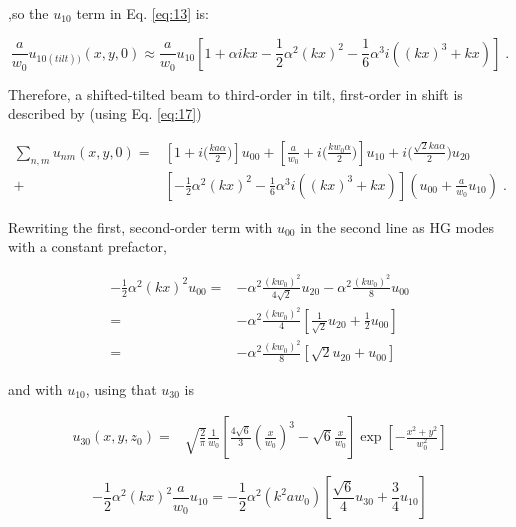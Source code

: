 \documentclass[aps,twoside,secnumarabic,balancelastpage,amsmath,amssymb,nofootinbib,hyperref=pdftex]{revtex4}
\newcommand{\bigfrac}[2]{\Big( \frac{#1}{#2}\Big)}
\begin{document}
,so the $u_{10}$ term in Eq. \ref{eq:13} is:

	\begin{equation*}
		\frac{a}{w_0} u_{10 (tilt))}(x,y,0) 
			 \approx 
			\frac{a}{w_0}
			u_{10} 
			 [
                1 
                + \alpha i kx 
                - \frac{1}{2}\alpha^2 (kx)^2 
                - \frac{1}{6}\alpha^3 i ((kx)^3+kx) 
             ]
			\;.
	\end{equation*}

Therefore, a shifted-tilted beam to third-order in tilt, first-order in shift is described by (using Eq.  \ref{eq:17})

	\begin{align*}
		\sum_{n,m} u_{nm}(x,y,0)=&
			\left[
				1+
				i \bigfrac{ k a \alpha}{ 2}
			\right]
			u_{00}
			+
			\left[
			\frac{a}{w_{0}}		
			+
			i  \bigfrac{k w_{0} \alpha}{2}	
			\right]			
			u_{10}
			+
			i  
				\bigfrac{\sqrt{2} k a \alpha}{ 2}
			u_{20}
			\\ + &
			 [
                - \frac{1}{2}\alpha^2 (kx)^2 
                - \frac{1}{6}\alpha^3 i ((kx)^3+kx) 
             ]
 (		
			u_{00} 
			+
			\frac{a}{w_0} u_{10} 
			)
				 \; .
	\end{align*}
	
Rewriting the first, second-order term with $u_{00}$ in the second line as HG modes with a constant prefactor, 

\begin{align*}
	-\frac{1}{2}\alpha^2 (kx)^2 u_{00} = &
	-\alpha^2 \frac{ (k w_0)^2} {4 \sqrt{2}} u_{20}
	-\alpha^2 \frac{(kw_0)^2}{8} u_{00}
	\\ = &
	-\alpha^2  \frac{(k w_0)^2 }{4}
		[ \frac{1}{ \sqrt{2}} u_{20}
		+
		\frac{1}{2} u_{00}
		]
			\\ = &
	-\alpha^2  \frac{ (k w_0)^2 }{8}
		[  \sqrt{2} u_{20}
		+
		 u_{00}
		]
\end{align*}

and with $u_{10}$, using that $u_{30}$ is

\begin{align*}
u_{30} (x,y,z_0) = &
 \sqrt{\frac{2}{\pi}}
 \frac{1}{w_0}
 [
 \frac{4 \sqrt{6}}{3} (\frac{x}{w_0})^3
 -
 \sqrt{6} \frac{x}{w_0}
 ]
 \exp
 [
 -\frac{x^2+y^2}{w_0^2}
 ]
\end{align*}



\begin{equation*}
	- \frac{1}{2}\alpha^2 (kx)^2 \frac{a}{w_0}u_{10} = 
	-\frac{1}{2}\alpha^2  (k^2 a w_0)
	[	
	 \frac{ \sqrt{6}} {4} u_{30}
	+ \frac{3}{4} u_{10}
	]
\end{equation*}
\end{document}
